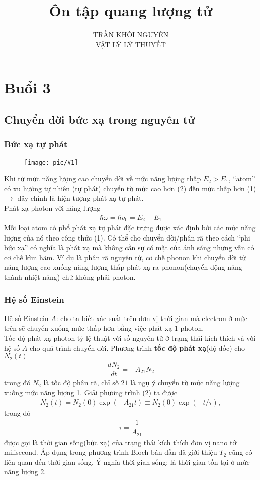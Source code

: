 \documentclass{report}
\title{\Huge{Ôn tập quang lượng tử}}
\newcommand{\image}[1]{
\begin{figure}[H]
	\centering
	\texttt{[image: pic/\#1]}
	\label{#1}
\end{figure}
}
\newcommand{\q}[1]{``#1''}
\newcommand{\f}[2]{\dfrac{#1}{#2}}
\begin{document}
\setlength{\parindent}{20pt}
\newpage
\author{TRẦN KHÔI NGUYÊN \\ VẬT LÝ LÝ THUYẾT}
\maketitle
\tableofcontents
\setcounter{chapter}{3}
\chapter{Buổi 3}
\section{Chuyển dời bức xạ trong nguyên tử}
\subsection{Bức xạ tự phát}
\image{bucxatuphat.png}
Khi từ mức năng lượng cao chuyển dời về mức năng lượng thấp $E_{2} > E_{1}$, \q{atom} có xu hướng tự nhiên (tự phát) chuyển từ mức cao hơn (2) đến mức thấp hơn (1) $\rightarrow$ đây chính là hiện tượng phát xạ tự phát.\\
Phát xạ photon với năng lượng
\begin{gather}
	\hbar \omega = \hbar v_{0} = E_{2} - E_{1}
\end{gather}
Mỗi loại atom có phổ phát xạ tự phát đặc trưng được xác định bởi các mức năng lượng của nó theo công thức (1).
Có thể cho chuyển dời/phân rã theo cách \q{phi bức xạ} có nghĩa là phát xạ mà không cần sự có mặt của ánh sáng nhưng vẫn có cơ chế kìm hãm. Ví dụ là phân rã nguyên tử, cơ chế phonon khi chuyển dời từ năng lượng cao xuống năng lượng thấp phát xạ ra phonon(chuyển động năng thành nhiệt năng) chứ không phải photon.
\subsection{Hệ số Einstein}
Hệ số Einstein $A$: cho ta biết xác suất trên đơn vị thời gian mà electron ở mức trên sẽ chuyển xuống mức thấp hơn bằng việc phát xạ 1 photon.\\
Tốc độ phát xạ photon tỷ lệ thuật với số nguyên tử ở trạng thái kích thích và với hệ số $A$ cho quá trình chuyển dời. Phương trình \textbf{tốc độ phát xạ}(độ dốc) cho $N_{2}(t)$
\begin{gather}
	\f{dN_{2}}{dt} = -A_{21} N_{2}
\end{gather}
trong đó $N_{2}$ là tốc độ phân rã, chỉ số $21$ là ngụ ý chuyển từ mức năng lượng xuống mức năng lượng 1. Giải phương trình (2) ta được
\begin{gather}
	N_{2}(t) = N_{2}(0) \exp(-A_{21}t) \equiv N_{2}(0) \exp(-t/\tau),
\end{gather}
trong đó
\begin{gather}
	\tau = \f{1}{A_{21}}
\end{gather}
được gọi là thời gian sống(bức xạ) của trạng thái kích thích đơn vị nano tới milisecond. Áp dụng trong phương trình Bloch bán dẫn đã giới thiệu $T_{2}$ cũng có liên quan đến thời gian sống. Ý nghĩa thời gian sống: là thời gian tồn tại ở mức năng lượng	2.
\end{document}
